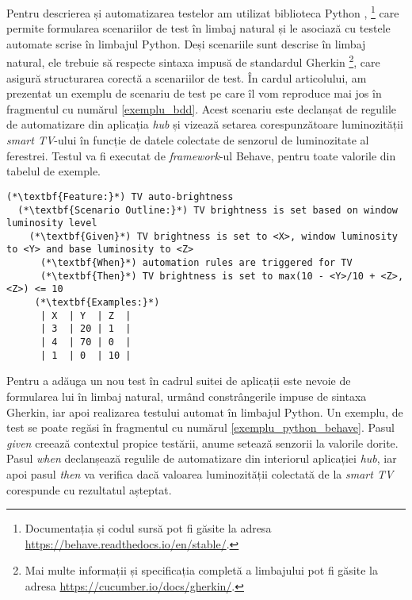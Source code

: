 Pentru descrierea și automatizarea testelor am utilizat biblioteca Python , \footnote{Documentația și codul sursă pot fi găsite la adresa \url{https://behave.readthedocs.io/en/stable/}.} care permite formularea scenariilor de test în limbaj natural și le asociază cu testele automate scrise în limbajul Python. Deși scenariile sunt descrise în limbaj natural, ele trebuie să respecte sintaxa impusă de standardul Gherkin \footnote{Mai multe informații și specificația completă a limbajului pot fi găsite la adresa \url{https://cucumber.io/docs/gherkin/}.}, care asigură structurarea corectă a scenariilor de test. În cardul articolului, am prezentat un exemplu de scenariu de test pe care îl vom reproduce mai jos în fragmentul cu numărul \ref{exemplu_bdd}. Acest scenariu este declanșat de regulile de automatizare din aplicația \textit{hub} și vizează setarea corespunzătoare luminozității \textit{smart TV}-ului în funcție de datele colectate de senzorul de luminozitate al ferestrei. Testul va fi executat de \textit{framework}-ul Behave, pentru toate valorile din tabelul de exemple.

\begin{lstlisting}[caption={Exemplu de scenariu de test BDD pentru aplicațiile din suită}, label={exemplu_bdd}]
(*\textbf{Feature:}*) TV auto-brightness
  (*\textbf{Scenario Outline:}*) TV brightness is set based on window luminosity level
    (*\textbf{Given}*) TV brightness is set to <X>, window luminosity to <Y> and base luminosity to <Z>
      (*\textbf{When}*) automation rules are triggered for TV
      (*\textbf{Then}*) TV brightness is set to max(10 - <Y>/10 + <Z>, <Z>) <= 10
     (*\textbf{Examples:}*)
      | X  | Y  | Z  |
      | 3  | 20 | 1  |
      | 4  | 70 | 0  |
      | 1  | 0  | 10 |
\end{lstlisting}

Pentru a adăuga un nou test în cadrul suitei de aplicații este nevoie de formularea lui în limbaj natural, urmând constrângerile impuse de sintaxa Gherkin, iar apoi realizarea testului automat în limbajul Python. Un exemplu, de test se poate regăsi în fragmentul cu numărul \ref{exemplu_python_behave}. Pasul \textit{given} creează contextul propice testării, anume setează senzorii la valorile dorite. Pasul \textit{when} declanșează regulile de automatizare din interiorul aplicației \textit{hub}, iar apoi pasul \textit{then} va verifica dacă valoarea luminozității colectată de la \textit{smart TV} corespunde cu rezultatul așteptat.

